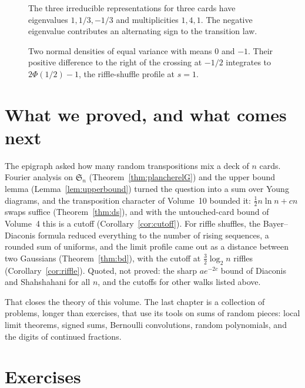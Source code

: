 

\begin{figure}[ht]
\centering{}
\caption{The three irreducible representations for three cards have eigenvalues $1,1/3,-1/3$ and multiplicities $1,4,1$. The negative eigenvalue contributes an alternating sign to the transition law.}
\label{fig:v11-ch13-three-card-spectrum}
\end{figure}

\begin{figure}[ht]
\centering{}
\caption{Two normal densities of equal variance with means $0$ and $-1$. Their positive difference to the right of the crossing at $-1/2$ integrates to $2\Phi(1/2)-1$, the riffle-shuffle profile at $s=1$.}
\label{fig:v11-ch13-riffle-normal}
\end{figure}

\section{What we proved, and what comes next}

The epigraph asked how many random transpositions mix a deck of $n$ cards. Fourier analysis on $\mathfrak S_n$ (Theorem~\ref{thm:plancherelG}) and
the upper bound lemma (Lemma~\ref{lem:upperbound}) turned the question into a sum over Young diagrams, and the transposition character of Volume~10
bounded it: $\frac12n\ln n+cn$ swaps suffice (Theorem~\ref{thm:ds}), and with the untouched-card bound of Volume~4 this is a cutoff
(Corollary~\ref{cor:cutoff}). For riffle shuffles, the Bayer--Diaconis formula reduced everything to the number of rising sequences, a rounded sum of
uniforms, and the limit profile came out as a distance between two Gaussians (Theorem~\ref{thm:bd}), with the cutoff at $\frac32\log_2n$ riffles
(Corollary~\ref{cor:riffle}). Quoted, not proved: the sharp $ae^{-2c}$ bound of Diaconis and Shahshahani for all $n$, and the cutoffs for other
walks listed above.

That closes the theory of this volume. The last chapter is a collection of problems, longer than exercises, that use its tools on sums of random
pieces: local limit theorems, signed sums, Bernoulli convolutions, random polynomials, and the digits of continued fractions.

\section{Exercises}

